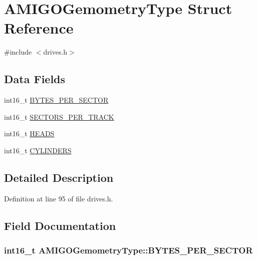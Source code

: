 \hypertarget{structAMIGOGemometryType}{}\section{A\+M\+I\+G\+O\+Gemometry\+Type Struct Reference}
\label{structAMIGOGemometryType}


{\ttfamily \#include $<$drives.\+h$>$}

\subsection*{Data Fields}
\begin{DoxyCompactItemize}
\item 
int16\+\_\+t \hyperlink{structAMIGOGemometryType_a38dc0b559f00c78f30fe0c43c53b582a}{B\+Y\+T\+E\+S\+\_\+\+P\+E\+R\+\_\+\+S\+E\+C\+T\+OR}
\item 
int16\+\_\+t \hyperlink{structAMIGOGemometryType_a9ac647c76bd331ab5b1fd22a4f5b9a4a}{S\+E\+C\+T\+O\+R\+S\+\_\+\+P\+E\+R\+\_\+\+T\+R\+A\+CK}
\item 
int16\+\_\+t \hyperlink{structAMIGOGemometryType_a33131d3948935e2064af9af151653033}{H\+E\+A\+DS}
\item 
int16\+\_\+t \hyperlink{structAMIGOGemometryType_a4282aeb6c4aac3b8cfc09e29402dcd3f}{C\+Y\+L\+I\+N\+D\+E\+RS}
\end{DoxyCompactItemize}


\subsection{Detailed Description}


Definition at line 95 of file drives.\+h.



\subsection{Field Documentation}
\subsubsection[{\texorpdfstring{B\+Y\+T\+E\+S\+\_\+\+P\+E\+R\+\_\+\+S\+E\+C\+T\+OR}{BYTES_PER_SECTOR}}]{\setlength{\rightskip}{0pt plus 5cm}int16\+\_\+t A\+M\+I\+G\+O\+Gemometry\+Type\+::\+B\+Y\+T\+E\+S\+\_\+\+P\+E\+R\+\_\+\+S\+E\+C\+T\+OR}\hypertarget{structAMIGOGemometryType_a38dc0b559f00c78f30fe0c43c53b582a}{}\label{structAMIGOGemometryType_a38dc0b559f00c78f30fe0c43c53b582a}


